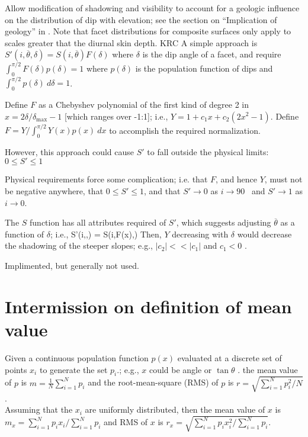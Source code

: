 \documentclass{article}
\begin{document}
Allow modification of shadowing and visibility to account for a geologic influence on the
distribution of dip with elevation; see the section on ``Implication of
geology'' in . Note that facet distributions for composite surfaces only apply to scales greater that the diurnal skin depth. KRC     A simple approach is $
S'(i,\overline{\theta},\delta) = S(i,\overline{\theta}) F(\delta)$ where
$\delta$ is the dip angle of a facet, and require $\int_0^{\pi/2}
F(\delta)p(\delta) =1$ where $p(\delta)$ is the population function of dips and
$\int_0^{\pi/2} p(\delta) \ d\delta =1$.

Define $F$ as a Chebyshev polynomial of the first kind of degree 2 in
$x=2\delta/\delta_\mathrm{max} -1$ [which ranges over -1:1]; i.e.,
$Y=1+c_1x+c_2(2x^2-1)$. Define $F=Y/\int_0^{\pi/2} Y(x)p(x)\ dx $ to accomplish
the required normalization.

However, this approach could cause $S'$ to fall outside the physical limits: $ 0
\leq S' \leq 1$

Physical requirements force some complication; i.e. that $F$, and hence $Y$,
must not be negative anywhere, that $ 0 \leq S' \leq 1$, and that $S'
\rightarrow 0$ as $i \rightarrow 90$\qd~ and $S' \rightarrow 1$ as $i
\rightarrow 0$.

 The $S$ function has all attributes required of $S'$, which suggests adjusting
 $\overline{\theta}$ as a function of $\delta$; i.e., \qbn
 S'(i,\overline{\theta},\delta) = S(i,F(x)\overline{\theta},\delta) \qen Then,
 $Y$ decreasing with $\delta$ would decrease the shadowing of the steeper
 slopes; e.g., $|c_2| << |c_1| $ and $c_1 < 0$ .

Implimented, but generally not used.

\section{Intermission on definition of mean value}

Given a continuous population function $p(x)$ evaluated at a discrete set of points $x_i$ to generate the set $p_i$.; e.g., $x$ could be angle or $\tan \theta$ .
\qi the mean value of $p$ is $ m=\frac{1}{N} \sum_{i=1}^N p_i $ and
 the root-mean-square (RMS) of $p$ is $ r=\sqrt{ \sum_{i=1}^N p_i^2 \big/ N }$.
\\ Assuming that the $x_i$ are uniformly distributed, then
\qi the mean value of $x$ is $ m_x=\sum_{i=1}^N p_i x_i \big/ \sum_{i=1}^N p_i $ 
and RMS of $x$ is 
$ r_x=\sqrt{ \sum_{i=1}^N p_i  x^2_i  \big/ \sum_{i=1}^N p_i }$.
\end{document}
